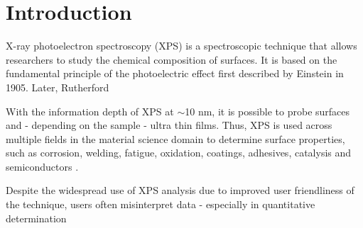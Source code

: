 



\chapter{Introduction} %
\label{Chapter1} %


\newcommand{\keyword}[1]{\textbf{#1}}
\newcommand{\tabhead}[1]{\textbf{#1}}
\newcommand{\code}[1]{\texttt{#1}}
\newcommand{\file}[1]{\texttt{\bfseries#1}}
\newcommand{\option}[1]{\texttt{\itshape#1}}




X-ray photoelectron spectroscopy (XPS) is a spectroscopic technique that allows researchers to study the chemical composition of surfaces. It is based on the fundamental principle of the photoelectric effect first described by Einstein \cite{einstein_uber_1905} in 1905. Later, Rutherford 

With the information depth of XPS at $\sim$10 nm, it is possible to probe surfaces and - depending on the sample - ultra thin films.
Thus, XPS is used across multiple fields in the material science domain to determine surface properties, such as corrosion, welding, fatigue, oxidation, coatings, adhesives, catalysis and semiconductors \cite{noauthor_x-ray_nodate}.


Despite the widespread use of XPS analysis due to improved user friendliness of the technique, users often misinterpret data - especially in quantitative determination \cite{shard_practical_2020}

